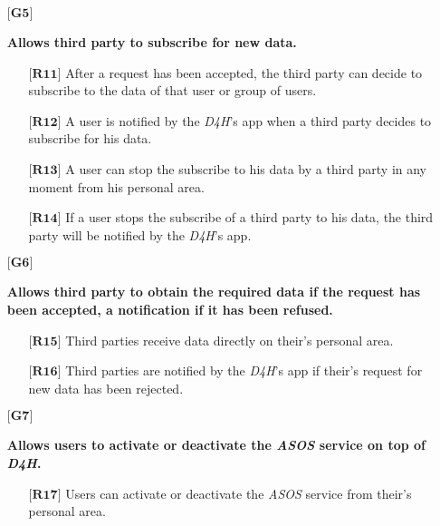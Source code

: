 \begin{itemize}
	\item[${\textbf{[G5]}}$] {\textbf{Allows third party to subscribe for new data.}
		\begin{itemize}
			\item[$\textbf{[R11]}$] {After a request has been accepted, the third party can decide to subscribe to the data of that user or group of users.}
			\item[$\textbf{[R12]}$] {A user is notified by the \hbox{\emph{D4H}}'s app when a third party decides to subscribe for his data.}
			\item[$\textbf{[R13]}$] {A user can stop the subscribe to his data by a third party in any moment from his personal area.}
			\item[$\textbf{[R14]}$] {If a user stops the subscribe of a third party to his data, the third party will be notified by the \hbox{\emph{D4H}}'s app.}
		\end{itemize}}


	\item[${\textbf{[G6]}}$] {\textbf{Allows third party to obtain the required data if the request has been accepted, a notification if it has been refused.}
		\begin{itemize}
			\item[$\textbf{[R15]}$] {Third parties receive data directly on their's personal area.}
			\item[$\textbf{[R16]}$] {Third parties are notified by the \hbox{\emph{D4H}}'s app if their's request for new data has been rejected.}
		\end{itemize}}


	\item[${\textbf{[G7]}}$] {\textbf{Allows users to activate or deactivate the \hbox{\emph{ASOS}} service on top of \hbox{\emph{D4H}}.}
		\begin{itemize}
			\item[$\textbf{[R17]}$] {Users can activate or deactivate the \hbox{\emph{ASOS}} service from their's personal area.}
		\end{itemize}}



\end{itemize}
